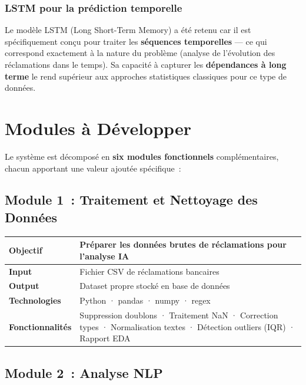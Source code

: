\documentclass[12pt,a4paper]{report}
\begin{document}
\subsection{LSTM pour la prédiction temporelle}

Le modèle LSTM (Long Short-Term Memory) a été retenu car il est spécifiquement conçu pour traiter les \textbf{séquences temporelles} --- ce qui correspond exactement à la nature du problème (analyse de l'évolution des réclamations dans le temps). Sa capacité à capturer les \textbf{dépendances à long terme} le rend supérieur aux approches statistiques classiques pour ce type de données.


\chapter{Modules à Développer}

Le système est décomposé en \textbf{six modules fonctionnels} complémentaires, chacun apportant une valeur ajoutée spécifique~:

\section{Module 1~: Traitement et Nettoyage des Données}

\begin{table}[H]
\centering
\begin{tabularx}{\textwidth}{|l|X|}
\hline
\textbf{Objectif} & Préparer les données brutes de réclamations pour l'analyse IA \\
\hline
\textbf{Input} & Fichier CSV de réclamations bancaires \\
\hline
\textbf{Output} & Dataset propre stocké en base de données \\
\hline
\textbf{Technologies} & Python · pandas · numpy · regex \\
\hline
\textbf{Fonctionnalités} & Suppression doublons · Traitement NaN · Correction types · Normalisation textes · Détection outliers (IQR) · Rapport EDA \\
\hline
\end{tabularx}
\end{table}

\section{Module 2~: Analyse NLP}
\end{document}
